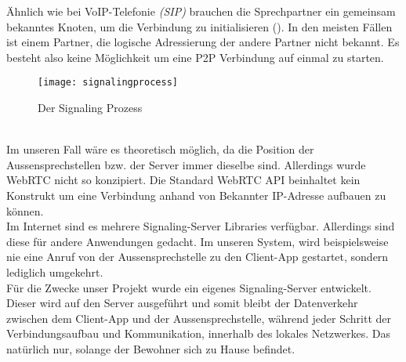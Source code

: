 Ähnlich wie bei VoIP-Telefonie \textit{(SIP)} brauchen die Sprechpartner ein gemeinsam bekanntes Knoten, um die Verbindung zu initialisieren (). In den meisten Fällen ist einem Partner, die logische Adressierung der andere Partner nicht bekannt. Es besteht also keine Möglichkeit um eine P2P Verbindung auf einmal zu starten. 
\begin{figure}[htb!]
	\begin{center}
		\texttt{[image: signalingprocess]}
		\caption[Der Signaling Prozess]{Der Signaling Prozess}
		\label{fig:signaling}
	\end{center}
\end{figure}
\\
Im unseren Fall wäre es theoretisch möglich, da die Position der Aussensprechstellen bzw. der Server immer dieselbe sind. Allerdings wurde WebRTC nicht so konzipiert. Die Standard WebRTC API beinhaltet kein Konstrukt um eine Verbindung anhand von Bekannter IP-Adresse aufbauen zu können.
\\
Im Internet sind es mehrere Signaling-Server Libraries verfügbar. Allerdings sind diese für andere Anwendungen gedacht. Im unseren System, wird beispielsweise nie eine Anruf von der Aussensprechstelle zu den Client-App gestartet, sondern lediglich umgekehrt.
\\
Für die Zwecke unser Projekt wurde ein eigenes Signaling-Server entwickelt. Dieser wird auf den Server ausgeführt und somit bleibt der Datenverkehr zwischen dem Client-App und der Aussensprechstelle, während jeder Schritt der Verbindungsaufbau und Kommunikation, innerhalb des lokales Netzwerkes. Das natürlich nur, solange der Bewohner sich zu Hause befindet.

